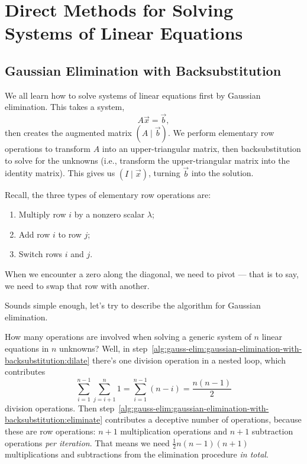 \chapter{Direct Methods for Solving Systems of Linear Equations}

\section{Gaussian Elimination with Backsubstitution}

We all learn how to solve systems of linear equations first by Gaussian
elimination. This takes a system,
\begin{equation}
A\vec{x}=\vec{b},
\end{equation}
then creates the augmented matrix $(A\mid\vec{b})$. We perform
elementary row operations to transform $A$ into an upper-triangular
matrix, then backsubstitution to solve for the unknowns (i.e., transform
the upper-triangular matrix into the identity matrix). This gives us
$(I\mid\vec{x})$, turning $\vec{b}$ into the solution.

Recall, the three types of elementary row operations are:
\begin{enumerate}
\item Multiply row $i$ by a nonzero scalar $\lambda$;
\item Add row $i$ to row $j$;
\item Switch rows $i$ and $j$.
\end{enumerate}
When we encounter a zero along the diagonal, we need to pivot --- that
is to say, we need to swap that row with another.

Sounds simple enough, let's try to describe the algorithm for Gaussian
elimination.

How many operations are involved when solving a generic system of $n$
linear equations in $n$ unknowns? Well, in
step~\ref{alg:gauss-elim:gaussian-elimination-with-backsubstitution:dilate}
there's one division operation in a nested loop, which contributes
\begin{equation}
\sum^{n-1}_{i=1}\sum^{n}_{j=i+1}1 = \sum^{n-1}_{i=1}(n-i) = \frac{n(n-1)}{2}
\end{equation}
division operations. Then step~\ref{alg:gauss-elim:gaussian-elimination-with-backsubstitution:eliminate}
contributes a deceptive number of operations, because these are row
operations: $n+1$ multiplication operations and $n+1$ subtraction
operations \emph{per iteration}. That means we need
$\frac{1}{2}n(n-1)(n+1)$ multiplications and subtractions from the
elimination procedure \emph{in total}.

